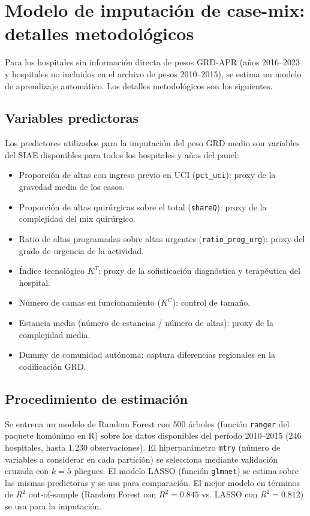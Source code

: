 \documentclass[12pt, a4paper, twoside, openright]{book}
\theoremstyle{plain}
\theoremstyle{definition}
\theoremstyle{remark}
\begin{document}
\section{Modelo de imputación de case-mix: detalles metodológicos}
\label{sec:casemix_imputacion}

Para los hospitales sin información directa de pesos GRD-APR (años 2016--2023 y hospitales no incluidos en el archivo de pesos 2010--2015), se estima un modelo de aprendizaje automático. Los detalles metodológicos son los siguientes.

\subsection{Variables predictoras}

Los predictores utilizados para la imputación del peso GRD medio son variables del SIAE disponibles para todos los hospitales y años del panel:

\begin{itemize}
  \item Proporción de altas con ingreso previo en UCI (\texttt{pct\_uci}): proxy de la gravedad media de los casos.
  \item Proporción de altas quirúrgicas sobre el total (\texttt{shareQ}): proxy de la complejidad del mix quirúrgico.
  \item Ratio de altas programadas sobre altas urgentes (\texttt{ratio\_prog\_urg}): proxy del grado de urgencia de la actividad.
  \item Índice tecnológico $K^T$: proxy de la sofisticación diagnóstica y terapéutica del hospital.
  \item Número de camas en funcionamiento ($K^C$): control de tamaño.
  \item Estancia media (número de estancias / número de altas): proxy de la complejidad media.
  \item Dummy de comunidad autónoma: captura diferencias regionales en la codificación GRD.
\end{itemize}

\subsection{Procedimiento de estimación}

Se entrena un modelo de Random Forest con 500 árboles (función \texttt{ranger} del paquete homónimo en R) sobre los datos disponibles del período 2010--2015 (246 hospitales, hasta 1.230 observaciones). El hiperparámetro \texttt{mtry} (número de variables a considerar en cada partición) se selecciona mediante validación cruzada con $k=5$ pliegues. El modelo LASSO (función \texttt{glmnet}) se estima sobre las mismas predictoras y se usa para comparación. El mejor modelo en términos de $R^2$ out-of-sample (Random Forest con $R^2 = 0.845$ vs. LASSO con $R^2 = 0.812$) se usa para la imputación.
\end{document}
